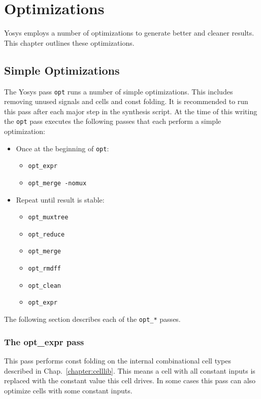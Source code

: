 
\chapter{Optimizations}
\label{chapter:opt}

Yosys employs a number of optimizations to generate better and cleaner results.
This chapter outlines these optimizations.

\section{Simple Optimizations}

The Yosys pass {\tt opt} runs a number of simple optimizations. This includes removing unused
signals and cells and const folding. It is recommended to run this pass after each major step
in the synthesis script. At the time of this writing the {\tt opt} pass executes the following
passes that each perform a simple optimization:

\begin{itemize}
\item Once at the beginning of {\tt opt}:
\begin{itemize}
\item {\tt opt\_expr}
\item {\tt opt\_merge -nomux}
\end{itemize}
\item Repeat until result is stable:
\begin{itemize}
\item {\tt opt\_muxtree}
\item {\tt opt\_reduce}
\item {\tt opt\_merge}
\item {\tt opt\_rmdff}
\item {\tt opt\_clean}
\item {\tt opt\_expr}
\end{itemize}
\end{itemize}

The following section describes each of the {\tt opt\_*} passes.

\subsection{The opt\_expr pass}

This pass performs const folding on the internal combinational cell types
described in Chap.~\ref{chapter:celllib}. This means a cell with all constant
inputs is replaced with the constant value this cell drives. In some cases
this pass can also optimize cells with some constant inputs.

